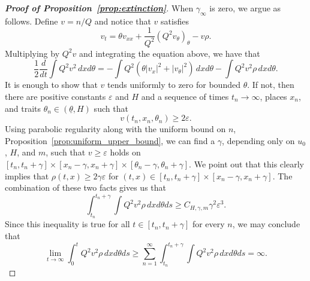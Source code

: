 \documentclass[11pt]{article}    %
\renewcommand{\epsilon}{\varepsilon}
\begin{document}
\begin{proof}[{\bf Proof of  Proposition~\ref{prop:extinction}}]
When $\gamma_\infty$ is zero, we argue as follows.  Define $v = n/Q$ and notice that $v$ satisfies
\[
	v_t = \theta v_{xx} + \frac{1}{Q^2} (Q^2 v_\theta)_\theta - v\rho.
\]
Multiplying by $Q^2 v$ and integrating the equation above, we have that
\begin{equation}\label{eq:energy}
	\frac{1}{2}\frac{d}{dt}\int Q^2 v^2\, dxd\theta = -\int Q^2\left( \theta |v_x|^2 + |v_\theta|^2\right)\, dx d\theta - \int Q^2 v^2 \rho\, dx d\theta.
\end{equation}
It is enough to show that $v$ tends uniformly to zero for bounded $\theta$.  If not, then there are positive constants $\epsilon$ and $H$ and a sequence of times $t_n\to \infty$, places $x_n$, and traits $\theta_n\in(\underline \theta, H)$ such that
\[
	v(t_n,x_n,\theta_n) \geq 2\epsilon.
\]
Using parabolic regularity along with the uniform bound on $n$, Proposition~\ref{prop:uniform_upper_bound}, we can find a $\gamma$, depending only on $u_0$, $H$, and $m$, such that $v \geq \epsilon$ holds on $[t_n, t_n + \gamma]\times [x_n- \gamma, x_n + \gamma]\times [\theta_n - \gamma, \theta_n + \gamma].$ 
We point out that this clearly implies that $\rho(t,x) \geq 2\gamma \epsilon$ for $(t,x) \in [t_n, t_n + \gamma]\times[x_n - \gamma, x_n + \gamma]$.  The combination of these two facts gives us that
\[
	\int_{t_n}^{t_n+\gamma}\int Q^2 v^2 \rho\, dx d\theta ds
		\geq C_{H,\gamma,m} \gamma^2 \epsilon^3.
\]
Since this inequality is true for all $t\in[t_n,t_n + \gamma]$ for every $n$, we may conclude that
\[
	\lim_{t\to\infty} \int_0^t Q^2 v^2 \rho\, dxd\theta ds
		\geq \sum_{n=1}^\infty \int_{t_n}^{t_n+\gamma}\int Q^2 v^2 \rho\, dx d\theta ds = \infty.
\]
%
%

\end{proof}
\end{document}
